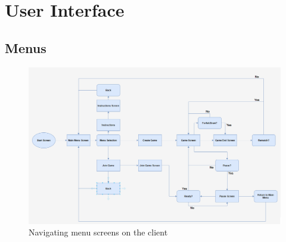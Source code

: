 \documentclass[10pt]{article}
\begin{document}
\section{User Interface}

\subsection{Menus}

\begin{figure}[h!]
    \centering
    \includegraphics[width=16cm,scale=.5]{User Interface.png}
    \caption{Navigating menu screens on the client}
\end{figure}
\end{document}
